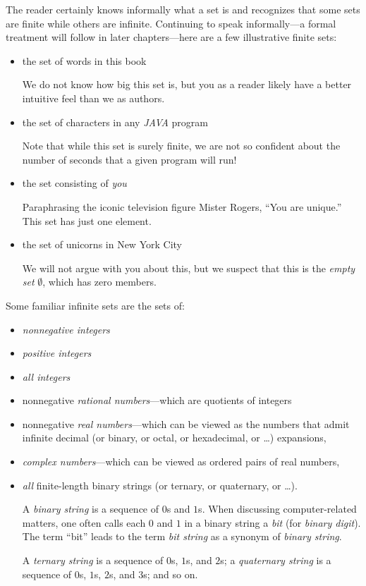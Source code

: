 The reader certainly knows informally what a set is and recognizes that some sets are finite while others are infinite.  Continuing to speak informally---a formal treatment will follow in later
chapters---here are a few illustrative finite sets:
\begin{itemize}
\item
the set of words in this book

\smallskip

We do not know how big this set is, but you as a reader likely have a better intuitive feel than we as authors.
\medskip\item
the set of characters in any {\it JAVA} program

\smallskip

Note that while this set is surely finite, we are not so confident about the number of seconds that a given program will run!
\medskip\item
the set consisting of {\em you}

\smallskip

Paraphrasing the iconic television figure Mister Rogers, ``You are unique.''  This set has just one element.
\medskip\item
the set of unicorns in New York City

\smallskip


We will not argue with you about this, but we suspect that this is the {\em empty set} $\emptyset$, which has zero members.
\end{itemize}
Some familiar infinite sets are the sets of:
\begin{itemize}
\item
{\em nonnegative integers}
\medskip\item
{\em positive integers}
\medskip\item
{\em all integers}
\medskip\item
nonnegative {\em rational numbers}---which are quotients of integers
\medskip\item
nonnegative {\em real numbers}---which can be viewed as the numbers that admit infinite decimal (or binary, or octal, or hexadecimal, or \ldots) expansions,
\medskip\item
{\em complex numbers}---which can be viewed as ordered pairs of real numbers,
\medskip\item
{\em all} finite-length binary strings (or ternary, or quaternary, or \ldots).

\smallskip

  
A {\it binary string} is a sequence of $0$s and $1$s.  When discussing computer-related matters, one often calls each $0$ and $1$ in a binary string a {\it bit} (for {\it binary digit}).  The term ``bit'' leads to the term {\it bit string} as a synonym of {\it binary string}.

  
A {\it ternary string} is a sequence of $0$s, $1$s, and $2$s; a {\it quaternary string} is a sequence of $0$s, $1$s, $2$s, and $3$s; and so on.
\end{itemize}
